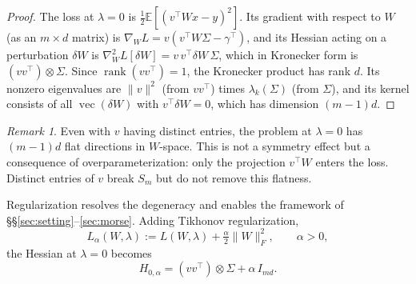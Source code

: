 \documentclass[11pt, reqno]{amsart}
\theoremstyle{plain}
\theoremstyle{definition}
\theoremstyle{remark}
\newtheorem{remark}[theorem]{Remark}
\begin{document}
\begin{proof}
The loss at $\lambda=0$ is $\tfrac12\mathbb E[(v^\top Wx-y)^2]$.
Its gradient with respect to $W$ (as an $m\times d$ matrix) is
$\nabla_W L=v(v^\top W\Sigma-\gamma^\top)$,
and its Hessian acting on a perturbation $\delta W$ is
$\nabla_W^2 L[\delta W]=v\,v^\top\delta W\,\Sigma$,
which in Kronecker form is $(vv^\top)\otimes\Sigma$.
Since $\operatorname{rank}(vv^\top)=1$, the Kronecker product has rank $d$.  Its nonzero eigenvalues are $\|v\|^2$ (from $vv^\top$) times $\lambda_k(\Sigma)$ (from $\Sigma$), and its kernel consists of all $\operatorname{vec}(\delta W)$ with $v^\top\delta W=0$, which has dimension $(m-1)d$.
\end{proof}

\begin{remark}
Even with $v$ having distinct entries, the problem at $\lambda=0$ has $(m-1)d$ flat directions in $W$-space.  This is not a symmetry effect but a consequence of overparameterization: only the projection $v^\top W$ enters the loss.  Distinct entries of $v$ break $S_m$ but do not remove this flatness.
\end{remark}

Regularization resolves the degeneracy and enables the framework of \S\S\ref{sec:setting}--\ref{sec:morse}.  Adding Tikhonov regularization,
\begin{equation}\label{eq:reg-loss}
  L_\alpha(W,\lambda):=L(W,\lambda)+\tfrac\alpha2\|W\|_F^2,\qquad \alpha>0,
\end{equation}
the Hessian at $\lambda=0$ becomes
\begin{equation}\label{eq:hess-reg}
  H_{0,\alpha}=(vv^\top)\otimes\Sigma + \alpha\, I_{md}.
\end{equation}
\end{document}
